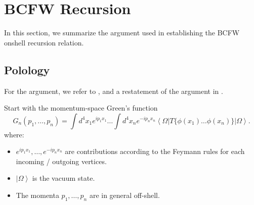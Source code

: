 \section{BCFW Recursion}

In this section, we summarize the argument used in establishing the BCFW onshell recursion relation.

\subsection{Polology}

For the argument, we refer to \autocite[Chapter~10.2]{weinbergQFT1995}, and a restatement of the argument in \autocite[Chapter~24.3]{schwartzQFT2014}.

Start with the momentum-space Green's function
\[
	G_n(p_1, \ldots, p_n) = \int d^4 x_1 e^{i p_1 x_1} \ldots \int  d^4 x_n e^{- i p_n x_n} \left\langle \Omega | T \{\phi(x_1) \ldots \phi(x_n)\} | \Omega \right\rangle	
.\] 
where:
\begin{itemize}
	\item $e^{i p_1 x_1}, \ldots, e^{- i p_n x_n }$ are contributions according to the Feymann rules for each incoming / outgoing vertices. 
	\item $\left| \Omega \right\rangle$ is the vacuum state.
	\item The momenta $p_1, \ldots, p_n$ are in general off-shell.
\end{itemize}

